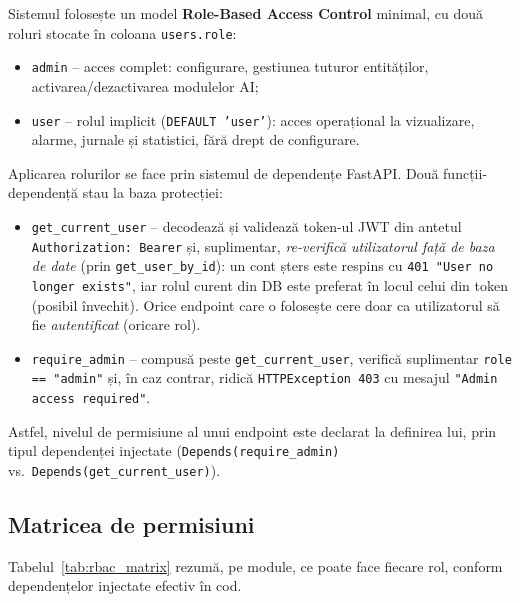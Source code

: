 \documentclass[../../main.tex]{subfiles}
\begin{document}
Sistemul folosește un model \textbf{Role-Based Access Control} minimal, cu două roluri stocate în coloana \texttt{users.role}:
\begin{itemize}
    \item \texttt{admin} -- acces complet: configurare, gestiunea tuturor entităților, activarea/dezactivarea modulelor AI;
    \item \texttt{user} -- rolul implicit (\texttt{DEFAULT 'user'}): acces operațional la vizualizare, alarme, jurnale și statistici, fără drept de configurare.
\end{itemize}

Aplicarea rolurilor se face prin sistemul de dependențe FastAPI. Două funcții-dependență stau la baza protecției:
\begin{itemize}
    \item \texttt{get\_current\_user} -- decodează și validează token-ul JWT din antetul \texttt{Authorization: Bearer} și, suplimentar, \emph{re-verifică utilizatorul față de baza de date} (prin \texttt{get\_user\_by\_id}): un cont șters este respins cu \texttt{401 "User no longer exists"}, iar rolul curent din DB este preferat în locul celui din token (posibil învechit). Orice endpoint care o folosește cere doar ca utilizatorul să fie \emph{autentificat} (oricare rol).
    \item \texttt{require\_admin} -- compusă peste \texttt{get\_current\_user}, verifică suplimentar \texttt{role == "admin"} și, în caz contrar, ridică \texttt{HTTPException 403} cu mesajul \texttt{"Admin access required"}.
\end{itemize}
Astfel, nivelul de permisiune al unui endpoint este declarat la definirea lui, prin tipul dependenței injectate (\texttt{Depends(require\_admin)} vs.\ \texttt{Depends(get\_\linebreak current\_user)}).

\subsection{Matricea de permisiuni}

Tabelul~\ref{tab:rbac_matrix} rezumă, pe module, ce poate face fiecare rol, conform dependențelor injectate efectiv în cod.
\end{document}
